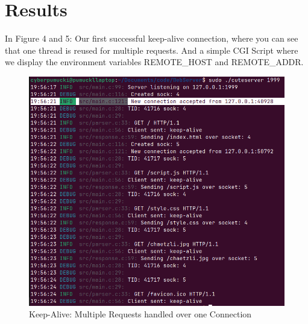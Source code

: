 \section*{Results}

In Figure 4 and 5: Our first successful keep-alive connection, where you can see that one thread is reused for multiple requests. %
And a simple CGI Script where we display the environment variables REMOTE\_HOST and REMOTE\_ADDR. 

\begin{figure}[h]
    \centering
    \begin{minipage}{0.55\textwidth}
        \centering
        \includegraphics[width=\textwidth]{figures/keep-alive.png}
        \caption{Keep-Alive: Multiple Requests handled over one Connection}
    \end{minipage}
    \hfill
    \begin{minipage}{0.35\textwidth}
        \centering

\end{minipage}
\end{figure}
